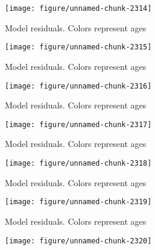 \documentclass[a4paper]{article}\usepackage{graphicx, color}
\makeatletter
\def\maxwidth{ %
  \ifdim\Gin@nat@width>\linewidth
    \linewidth
  \else
    \Gin@nat@width
  \fi
}
\newenvironment{knitrout}{}{} %
\makeatother
\begin{document}
\begin{knitrout}
\begin{figure}[H]
{\centering \texttt{[image: figure/unnamed-chunk-2314]} 

}

\caption[Model residuals]{Model residuals. Colors represent ages\label{fig:unnamed-chunk-2314}}
\end{figure}
\begin{figure}[H]


{\centering \texttt{[image: figure/unnamed-chunk-2315]} 

}

\caption[Model residuals]{Model residuals. Colors represent ages\label{fig:unnamed-chunk-2315}}
\end{figure}
\begin{figure}[H]


{\centering \texttt{[image: figure/unnamed-chunk-2316]} 

}

\caption[Model residuals]{Model residuals. Colors represent ages\label{fig:unnamed-chunk-2316}}
\end{figure}
\begin{figure}[H]


{\centering \texttt{[image: figure/unnamed-chunk-2317]} 

}

\caption[Model residuals]{Model residuals. Colors represent ages\label{fig:unnamed-chunk-2317}}
\end{figure}
\begin{figure}[H]


{\centering \texttt{[image: figure/unnamed-chunk-2318]} 

}

\caption[Model residuals]{Model residuals. Colors represent ages\label{fig:unnamed-chunk-2318}}
\end{figure}
\begin{figure}[H]


{\centering \texttt{[image: figure/unnamed-chunk-2319]} 

}

\caption[Model residuals]{Model residuals. Colors represent ages\label{fig:unnamed-chunk-2319}}
\end{figure}
\begin{figure}[H]


{\centering \texttt{[image: figure/unnamed-chunk-2320]} 

}


\end{figure}
\end{knitrout}
\end{document}
